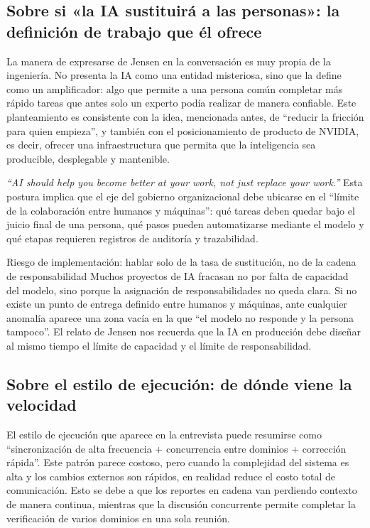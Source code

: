 \subsection{Sobre si «la IA sustituirá a las personas»: la definición de trabajo que él ofrece}

La manera de expresarse de Jensen en la conversación es muy propia de la ingeniería. No presenta la IA como una entidad misteriosa, sino que la define como un amplificador: algo que permite a una persona común completar más rápido tareas que antes solo un experto podía realizar de manera confiable. Este planteamiento es consistente con la idea, mencionada antes, de ``reducir la fricción para quien empieza'', y también con el posicionamiento de producto de NVIDIA, es decir, ofrecer una infraestructura que permita que la inteligencia sea producible, desplegable y mantenible.

\textit{``AI should help you become better at your work, not just replace your work.''} Esta postura implica que el eje del gobierno organizacional debe ubicarse en el ``límite de la colaboración entre humanos y máquinas'': qué tareas deben quedar bajo el juicio final de una persona, qué pasos pueden automatizarse mediante el modelo y qué etapas requieren registros de auditoría y trazabilidad.

\begin{warningbox}{Riesgo de implementación: hablar solo de la tasa de sustitución, no de la cadena de responsabilidad}
Muchos proyectos de IA fracasan no por falta de capacidad del modelo, sino porque la asignación de responsabilidades no queda clara. Si no existe un punto de entrega definido entre humanos y máquinas, ante cualquier anomalía aparece una zona vacía en la que ``el modelo no responde y la persona tampoco''. El relato de Jensen nos recuerda que la IA en producción debe diseñar al mismo tiempo el límite de capacidad y el límite de responsabilidad.
\end{warningbox}

\subsection{Sobre el estilo de ejecución: de dónde viene la velocidad}

El estilo de ejecución que aparece en la entrevista puede resumirse como ``sincronización de alta frecuencia + concurrencia entre dominios + corrección rápida''. Este patrón parece costoso, pero cuando la complejidad del sistema es alta y los cambios externos son rápidos, en realidad reduce el costo total de comunicación. Esto se debe a que los reportes en cadena van perdiendo contexto de manera continua, mientras que la discusión concurrente permite completar la verificación de varios dominios en una sola reunión.

